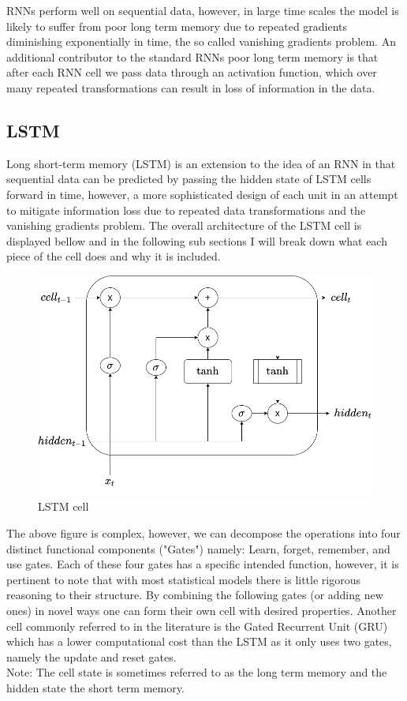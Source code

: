 \documentclass{article}
\begin{document}
RNNs perform well on sequential data, however, in large time scales the model is likely to suffer from poor long term memory due to repeated gradients diminishing exponentially in time, the so called vanishing gradients problem. An additional contributor to the standard RNNs poor long term memory is that after each RNN cell we pass data through an activation function, which over many repeated transformations can result in loss of information in the data. 
\subsection{LSTM}
\label{sec:LSTM}
Long short-term memory (LSTM) is an extension to the idea of an RNN in that sequential data can be predicted by passing the hidden state of LSTM cells forward in time, however, a more sophisticated design of each unit in an attempt to mitigate information loss due to repeated data transformations and the vanishing gradients problem. The overall architecture of the LSTM cell is displayed bellow and in the following sub sections I will break down what each piece of the cell does and why it is included. 
\begin{figure}[H]
\caption{LSTM cell \cite{LSTM}}
\label{fig:RNN}
\includegraphics[scale=0.4]{LSTM_cell.png}
\end{figure}
The above figure is complex, however, we can decompose the operations into four distinct functional components ("Gates") namely: Learn, forget, remember, and use gates. Each of these four gates has a specific intended function, however, it is pertinent to note that with most statistical models there is little rigorous reasoning to their structure. By combining the following gates (or adding new ones) in novel ways one can form their own cell with desired properties. Another cell commonly referred to in the literature is the Gated Recurrent Unit (GRU) which has a lower computational cost than the LSTM as it only uses two gates, namely the update and reset gates.\\
Note: The cell state is sometimes referred to as the long term memory and the hidden state the short term memory.
\end{document}
